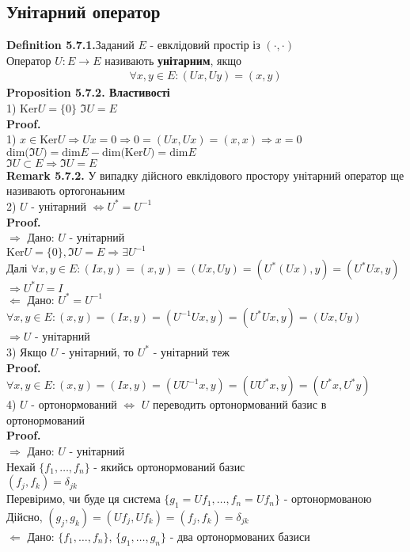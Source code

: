 \documentclass[a4paper, 14pt]{extarticle}
\def\defin#1{\textbf{Definition {#1}}}
\def\rm#1{\textbf{Remark {#1}}}
\def\prp#1{\textbf{Proposition {#1}}}
\def\proof{\textbf{Proof.}\\}
\def\bigline{\vspace{5mm}\\}
\def\dim#1{\textrm{dim} {#1}}
\def\ker#1{\textrm{Ker} {#1}}
\begin{document}
\subsection{Унітарний оператор}
\defin{5.7.1.}Заданий $E$ - евклідовий простір із $(\cdot, \cdot)$\\
Оператор $U: E \to E$ називають \textbf{унітарним}, якщо
\begin{align*}
\forall x,y \in E: (Ux,Uy) = (x,y)
\end{align*}
\prp{5.7.2. Властивості}\\
1) $\ker U = \{0\}$ \hspace{1cm} $\Im U = E$\\
\proof
1) $x \in \ker U \Rightarrow Ux = 0 \Rightarrow 0 = (Ux, Ux) = (x,x) \Rightarrow x = 0$\\
$\dim(\Im U) = \dim E - \dim(\ker U) = \dim E$\\
$\Im U \subset E \Rightarrow \Im U = E$
\bigline
\rm{5.7.2.} У випадку дійсного евклідового простору унітарний оператор ще називають ортогонаьним
\bigline
2) $U$ - унітарний $\iff U^* = U^{-1}$\\
\proof
$\boxed{\Rightarrow}$ Дано: $U$ - унітарний\\
$\ker U = \{0\}, \Im U = E \Rightarrow \exists U^{-1}$\\
Далі $\forall x,y \in E: (Ix,y) = (x,y) = (Ux,Uy) = (U^*(Ux), y) = (U^*Ux,y)$\\
$\Rightarrow U^* U = I$
\bigline
$\boxed{\Leftarrow}$ Дано: $U^* = U^{-1}$\\
$\forall x,y \in E: (x,y) = (Ix, y) = (U^{-1}Ux, y) = (U^*Ux,y) = (Ux, Uy)$\\
$\Rightarrow U$ - унітарний
\bigline
3) Якщо $U$ - унітарний, то $U^*$ - унітарний теж\\
\proof
$\forall x,y \in E: (x,y) = (Ix,y) = (UU^{-1}x,y) = (UU^* x,y) = (U^*x,U^*y)$
\bigline
4) $U$ - ортонормований $\iff$ $U$ переводить ортонормований базис в ортонормований\\
\proof
$\boxed{\Rightarrow}$ Дано: $U$ - унітарний\\
Нехай $\{f_1,\dots,f_n\}$ - якийсь ортонормований базис\\
$(f_j,f_k) = \delta_{jk}$\\
Перевіримо, чи буде ця система $\{g_1 = Uf_1, \dots, f_n = Uf_n\}$ - ортонормованою\\
Дійсно, $(g_j,g_k) = (Uf_j, Uf_k) = (f_j,f_k) = \delta_{jk}$
\bigline
$\boxed{\Leftarrow}$ Дано: $\{f_1,\dots,f_n\}$, $\{g_1,\dots,g_n\}$ - два ортонормованих базиси\\
\end{document}
